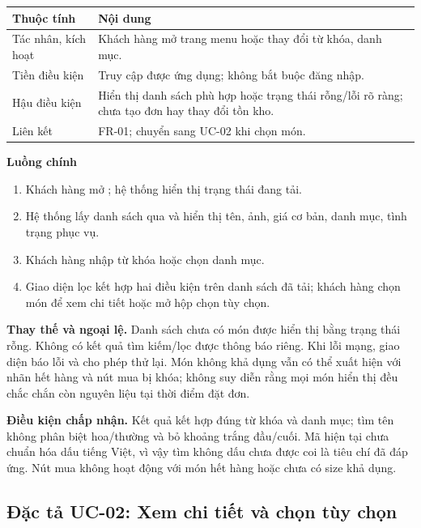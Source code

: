 \begin{longtable}{|p{3.1cm}|p{11.5cm}|}
\hline \textbf{Thuộc tính} & \textbf{Nội dung} \\ \hline
Tác nhân, kích hoạt & Khách hàng mở trang menu hoặc thay đổi từ khóa,
danh mục. \\ \hline
Tiền điều kiện & Truy cập được ứng dụng; không bắt buộc đăng nhập. \\ \hline
Hậu điều kiện & Hiển thị danh sách phù hợp hoặc trạng thái rỗng/lỗi rõ
ràng; chưa tạo đơn hay thay đổi tồn kho. \\ \hline
Liên kết & FR-01; chuyển sang UC-02 khi chọn món. \\ \hline
\end{longtable}

\textbf{Luồng chính}
\begin{enumerate}[nosep]
  \item Khách hàng mở ; hệ thống hiển thị trạng thái đang tải.
  \item Hệ thống lấy danh sách qua  và hiển thị
  tên, ảnh, giá cơ bản, danh mục, tình trạng phục vụ.
  \item Khách hàng nhập từ khóa hoặc chọn danh mục.
  \item Giao diện lọc kết hợp hai điều kiện trên danh sách đã tải; khách
  hàng chọn món để xem chi tiết hoặc mở hộp chọn tùy chọn.
\end{enumerate}

\textbf{Thay thế và ngoại lệ.} Danh sách chưa có món được hiển thị bằng
trạng thái rỗng. Không có kết quả tìm kiếm/lọc được thông báo riêng. Khi
lỗi mạng, giao diện báo lỗi và cho phép thử lại. Món không khả dụng vẫn
có thể xuất hiện với nhãn hết hàng và nút mua bị khóa; không suy diễn rằng
mọi món hiển thị đều chắc chắn còn nguyên liệu tại thời điểm đặt đơn.

\textbf{Điều kiện chấp nhận.} Kết quả kết hợp đúng từ khóa và danh mục;
tìm tên không phân biệt hoa/thường và bỏ khoảng trắng đầu/cuối. Mã hiện
tại chưa chuẩn hóa dấu tiếng Việt, vì vậy tìm không dấu chưa được coi là
tiêu chí đã đáp ứng. Nút mua không hoạt động với món hết hàng hoặc chưa có
size khả dụng.

\subsection{Đặc tả UC-02: Xem chi tiết và chọn tùy chọn}
\label{uc:02}
\label{uc02}

